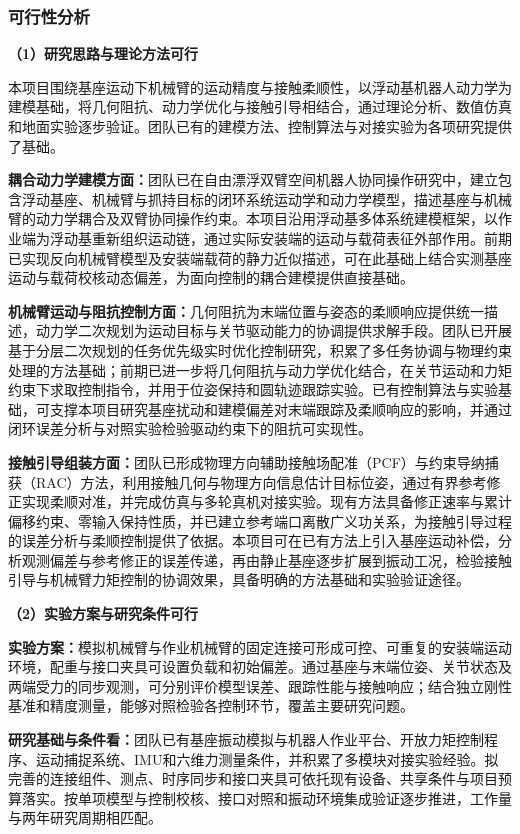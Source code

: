 \documentclass[UTF8,a4paper,zihao=-4,fontset=fandol]{ctexart}
\newcommand{\topic}[1]{\par\Needspace{4\baselineskip}\addvspace{0.5em}\noindent\textbf{#1}\par\nobreak}
\begin{document}
\subsubsection{可行性分析}

\topic{（1）研究思路与理论方法可行}

本项目围绕基座运动下机械臂的运动精度与接触柔顺性，以浮动基机器人动力学为建模基础，将几何阻抗、动力学优化与接触引导相结合，通过理论分析、数值仿真和地面实验逐步验证。团队已有的建模方法、控制算法与对接实验为各项研究提供了基础。

\textbf{耦合动力学建模方面：}团队已在自由漂浮双臂空间机器人协同操作研究中，建立包含浮动基座、机械臂与抓持目标的闭环系统运动学和动力学模型，描述基座与机械臂的动力学耦合及双臂协同操作约束\cite{su2026}。本项目沿用浮动基多体系统建模框架，以作业端为浮动基重新组织运动链，通过实际安装端的运动与载荷表征外部作用。前期已实现反向机械臂模型及安装端载荷的静力近似描述，可在此基础上结合实测基座运动与载荷校核动态偏差，为面向控制的耦合建模提供直接基础。

\textbf{机械臂运动与阻抗控制方面：}几何阻抗为末端位置与姿态的柔顺响应提供统一描述，动力学二次规划为运动目标与关节驱动能力的协调提供求解手段。团队已开展基于分层二次规划的任务优先级实时优化控制研究，积累了多任务协调与物理约束处理的方法基础\cite{su2026}；前期已进一步将几何阻抗与动力学优化结合，在关节运动和力矩约束下求取控制指令，并用于位姿保持和圆轨迹跟踪实验。已有控制算法与实验基础，可支撑本项目研究基座扰动和建模偏差对末端跟踪及柔顺响应的影响，并通过闭环误差分析与对照实验检验驱动约束下的阻抗可实现性。

\textbf{接触引导组装方面：}团队已形成物理方向辅助接触场配准（PCF）与约束导纳捕获（RAC）方法，利用接触几何与物理方向信息估计目标位姿，通过有界参考修正实现柔顺对准，并完成仿真与多轮真机对接实验。现有方法具备修正速率与累计偏移约束、零输入保持性质，并已建立参考端口离散广义功关系，为接触引导过程的误差分析与柔顺控制提供了依据。本项目可在已有方法上引入基座运动补偿，分析观测偏差与参考修正的误差传递，再由静止基座逐步扩展到振动工况，检验接触引导与机械臂力矩控制的协调效果，具备明确的方法基础和实验验证途径。

\topic{（2）实验方案与研究条件可行}

\textbf{实验方案：}模拟机械臂与作业机械臂的固定连接可形成可控、可重复的安装端运动环境，配重与接口夹具可设置负载和初始偏差。通过基座与末端位姿、关节状态及两端受力的同步观测，可分别评价模型误差、跟踪性能与接触响应；结合独立刚性基准和精度测量，能够对照检验各控制环节，覆盖主要研究问题。

\textbf{研究基础与条件看：}团队已有基座振动模拟与机器人作业平台、开放力矩控制程序、运动捕捉系统、IMU和六维力测量条件，并积累了多模块对接实验经验。拟完善的连接组件、测点、时序同步和接口夹具可依托现有设备、共享条件与项目预算落实。按单项模型与控制校核、接口对照和振动环境集成验证逐步推进，工作量与两年研究周期相匹配。
\end{document}
